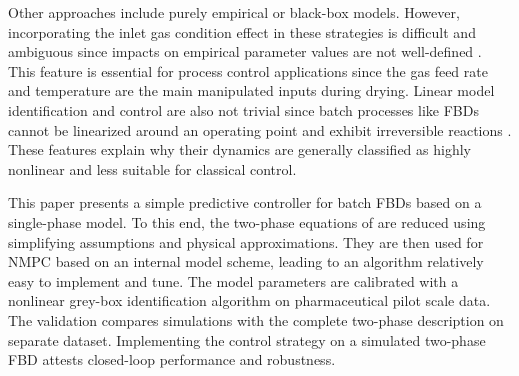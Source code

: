 Other approaches include purely empirical or black-box models. However, incorporating the inlet gas condition effect in these strategies is difficult and ambiguous since impacts on empirical parameter values are not well-defined \citep{handbookDrying}. This feature is essential for process control applications since the gas feed rate and temperature are the main manipulated inputs during drying. Linear model identification and control are also not trivial since batch processes like \glspl{FBD} cannot be linearized around an operating point and exhibit irreversible reactions \citep{robustNMPC}. These features explain why their dynamics are generally classified as highly nonlinear and less suitable for classical control.

This paper presents a simple predictive controller for batch \glspl{FBD} based on a single-phase model. To this end, the two-phase equations of \citet{fbd2phFG} are reduced using simplifying assumptions and physical approximations. They are then used for \gls{NMPC} based on an internal model scheme, leading to an algorithm relatively easy to implement and tune. The model parameters are calibrated with a nonlinear grey-box identification algorithm on pharmaceutical pilot scale data. The validation compares simulations with the complete two-phase description on separate dataset. Implementing the control strategy on a simulated two-phase \gls{FBD} attests closed-loop performance and robustness. 